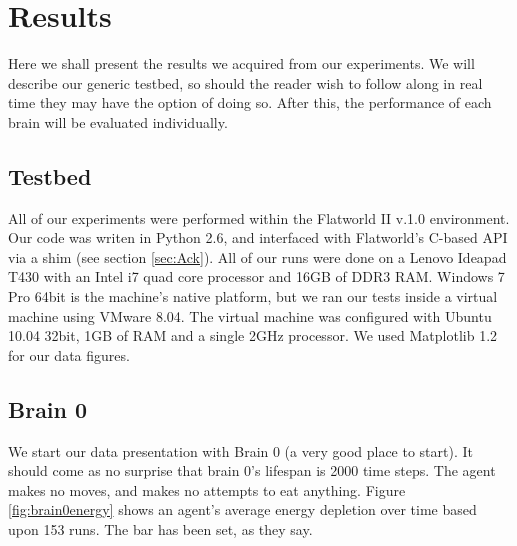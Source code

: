 \section{Results} \label{sec:Results}


Here we shall present the results we acquired from our experiments. We will
describe our generic testbed, so should the reader wish to follow along in
real time they may have the option of doing so. After this, the performance 
of each brain will be evaluated individually.

\subsection{Testbed}
All of our experiments were performed within the Flatworld II v.1.0 
environment. Our code was writen in Python 2.6, and interfaced with 
Flatworld's C-based API via a shim (see section \ref{sec:Ack}). All of our
runs were done on a Lenovo Ideapad T430 with an Intel i7 quad core processor
and 16GB of DDR3 RAM. Windows 7 Pro 64bit is the machine's native platform,
but we ran our tests inside a virtual machine using VMware 8.04. The virtual
machine was configured with Ubuntu 10.04 32bit, 1GB of RAM and a single 2GHz
processor. We used Matplotlib 1.2 for our data figures.


\subsection{Brain 0}
We start our data presentation with Brain 0 (a very good place to start).
It should come as no surprise that brain 0's lifespan is 2000 time steps. 
The agent makes no moves, and makes no attempts to eat anything. 
Figure \ref{fig:brain0energy} shows an agent's average energy depletion over 
time based upon 153 runs. The bar has been set, as they say.

